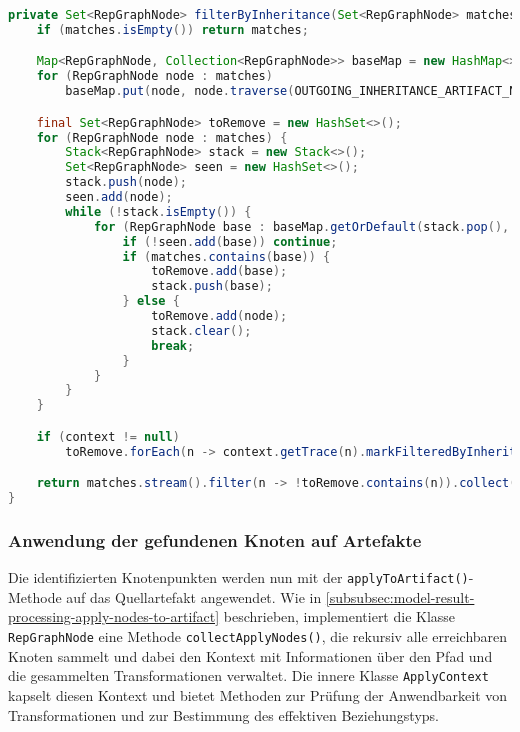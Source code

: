 \begin{lstlisting}[language=Java,caption={Methode \texttt{filterByInheritance}},label=lst:impl-filterByInheritance,basicstyle=\ttfamily\scriptsize]
private Set<RepGraphNode> filterByInheritance(Set<RepGraphNode> matches, RepMatchingContext context) {
    if (matches.isEmpty()) return matches;

    Map<RepGraphNode, Collection<RepGraphNode>> baseMap = new HashMap<>();
    for (RepGraphNode node : matches)
        baseMap.put(node, node.traverse(OUTGOING_INHERITANCE_ARTIFACT_NODE_QUERY).values());

    final Set<RepGraphNode> toRemove = new HashSet<>();
    for (RepGraphNode node : matches) {
        Stack<RepGraphNode> stack = new Stack<>();
        Set<RepGraphNode> seen = new HashSet<>();
        stack.push(node);
        seen.add(node);
        while (!stack.isEmpty()) {
            for (RepGraphNode base : baseMap.getOrDefault(stack.pop(), Collections.emptyList())) {
                if (!seen.add(base)) continue;
                if (matches.contains(base)) {
                    toRemove.add(base);
                    stack.push(base);
                } else {
                    toRemove.add(node);
                    stack.clear();
                    break;
                }
            }
        }
    }

    if (context != null)
        toRemove.forEach(n -> context.getTrace(n).markFilteredByInheritance());

    return matches.stream().filter(n -> !toRemove.contains(n)).collect(Collectors.toSet());
}
\end{lstlisting}

\subsubsection{Anwendung der gefundenen Knoten auf Artefakte}

Die identifizierten Knotenpunkten werden nun mit der \texttt{applyToArtifact()}-Methode auf das Quellartefakt angewendet.
Wie in \autoref{subsubsec:model-result-processing-apply-nodes-to-artifact} beschrieben, implementiert die Klasse \texttt{RepGraphNode} eine Methode \texttt{collectApplyNodes()}, die rekursiv alle erreichbaren Knoten sammelt und dabei den Kontext mit Informationen über den Pfad und die gesammelten Transformationen verwaltet.
Die innere Klasse \texttt{ApplyContext} kapselt diesen Kontext und bietet Methoden zur Prüfung der Anwendbarkeit von Transformationen und zur Bestimmung des effektiven Beziehungstyps.

